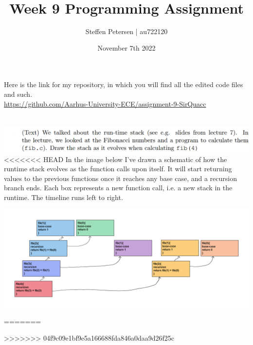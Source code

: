\documentclass{article}
\title{Week 9 Programming Assignment}
\author{Steffen Petersen | au722120}
\date{November 7th 2022}
\begin{document}

\maketitle
\vspace{5pt}
\noindent Here is the link for my repository, in which you will find all the edited code files and such.\\
\url{https://github.com/Aarhus-University-ECE/assignment-9-SirQuacc}
\section{}
\includegraphics[width=\linewidth, keepaspectratio=true]{task1}
\vspace{2pt}\\
<<<<<<< HEAD
In the image below I've drawn a schematic of how the runtime stack evolves as the function calls upon itself. It will start returning
values to the previous functions once it reaches any base case, and a recursion branch ends. Each box
represents a new function call, i.e. a new stack in the runtime.
The timeline runs left to right.

\begin{center}
    \includegraphics[width=0.95\linewidth, keepaspectratio=true]{runtimestack}
\end{center}

\pagebreak
=======


>>>>>>> 04f9c09e1bf9e5a166688fda846a0daa9d26f25c
\end{document}
